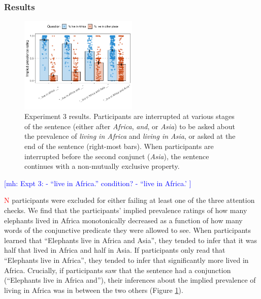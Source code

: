 \documentclass[10pt,letterpaper]{article}
\newcommand{\mh}[1]{{\textcolor{Blue}{[mh: #1]}}}
\newcommand{\red}[1]{{\textcolor{Red}{#1}}}
\begin{document}
 \subsubsection{Results}
 
\begin{figure}[h]
  \centering
    \includegraphics[width=0.5\textwidth]{expt3_summary}
  \caption{Experiment 3 results. Participants are interrupted at various stages of the sentence (either after \emph{Africa}, \emph{and}, or \emph{Asia}) to be asked about the prevalence of \emph{living in Africa} and \emph{living in Asia}, or asked at the end of the sentence (right-most bars). When participants are interrupted before the second conjunct (\emph{Asia}), the sentence continues with a non-mutually exclusive property.}
    \label{fig:expt3}
  \end{figure}
  
 \mh{Expt 3: 
 - ``live in Africa.'' condition?
 - ``live in Africa.'
 }
 

\red{N} participants were excluded for either failing at least one of the three attention checks.
We find that the participants' implied prevalence ratings of how many elephants lived in Africa monotonically decreased as a function of how many words of the conjunctive predicate they were allowed to see. 
When participants learned that ``Elephants live in Africa and Asia'', they tended to infer that it was half that lived in Africa and half in Asia.
If participants only read that ``Elephants live in Africa'', they tended to infer that significantly more lived in Africa. 
Crucially, if participants saw that the sentence had a conjunction (``Elephants live in Africa and''), their inferences about the implied prevalence of living in Africa was in between the two others (Figure \ref{fig:expt3}).
\end{document}
